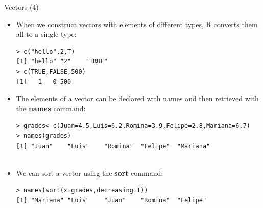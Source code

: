 \documentclass[handout]{beamer}
\begin{document}
 
\begin{frame}[fragile]{Vectors (4)}
\scriptsize{
\begin{itemize}
 
\item When we construct vectors with elements of different types, R converts them all to a single type:
\begin{verbatim}
> c("hello",2,T)
[1] "hello" "2"    "TRUE"
> c(TRUE,FALSE,500)
[1]   1   0 500 
\end{verbatim}

 \item The elements of a vector can be declared with names and then retrieved with the \textbf{names} command:
\begin{verbatim}
> grades<-c(Juan=4.5,Luis=6.2,Romina=3.9,Felipe=2.8,Mariana=6.7)
> names(grades)
[1] "Juan"    "Luis"    "Romina"  "Felipe"  "Mariana"
 
\end{verbatim}
\item We can sort a vector using the \textbf{sort} command:
\begin{verbatim}
> names(sort(x=grades,decreasing=T))
[1] "Mariana" "Luis"    "Juan"    "Romina"  "Felipe" 
\end{verbatim}

\end{itemize}



}
\end{frame}
\end{document}
